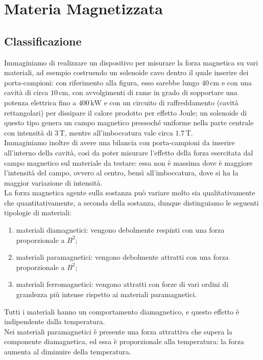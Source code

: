\section{Materia Magnetizzata}

\subsection{Classificazione}

Immaginiamo di realizzare un dispositivo per misurare la forza magnetica su vari materiali, ad esempio costruendo un solenoide cavo dentro il quale inserire dei porta-campioni: con riferimento alla figura, esso sarebbe lungo $ 40\,\text{cm} $ e con una cavità di circa $ 10\,\text{cm} $, con avvolgimenti di rame in grado di sopportare una potenza elettrica fino a $ 400\,\text{kW} $ e con un circuito di raffreddamento (cavità rettangolari) per dissipare il calore prodotto per effetto Joule; un solenoide di questo tipo genera un campo magnetico pressoché uniforme nella parte centrale con intensità di $ 3\,\text{T} $, mentre all'imboccatura vale circa $ 1.7\,\text{T} $. \\ 
%
Immaginiamo inoltre di avere una bilancia con porta-campioni da inserire all'interno della cavità, così da poter misurare l'effetto della forza esercitata dal campo magnetico sul materiale da testare: essa non è massima dove è maggiore l'intensità del campo, ovvero al centro, bensì all'imboccatura, dove si ha la maggior variazione di intensità. \\ 
%
La forza magnetica agente sulla sostanza può variare molto sia qualitativamente che quantitativamente, a seconda della sostanza, dunque distinguiamo le seguenti tipologie di materiali:
\begin{enumerate}
	\item materiali diamagnetici: vengono debolmente respinti con una forza proporzionale a $ B^2 $;
	\item materiali paramagnetici: vengono debolmente attratti con una forza proporzionale a $ B^2 $;
	\item materiali ferromagnetici: vengono attratti con forze di vari ordini di grandezza più intense rispetto ai materiali paramagnetici. 
\end{enumerate}
Tutti i materiali hanno un comportamento diamagnetico, e questo effetto è indipendente dalla temperatura. \\ 
Nei materiali paramagnetici è presente una forza attrattiva che supera la componente diamagnetica, ed essa è proporzionale alla temperatura: la forza aumenta al diminuire della temperatura. \\ 
